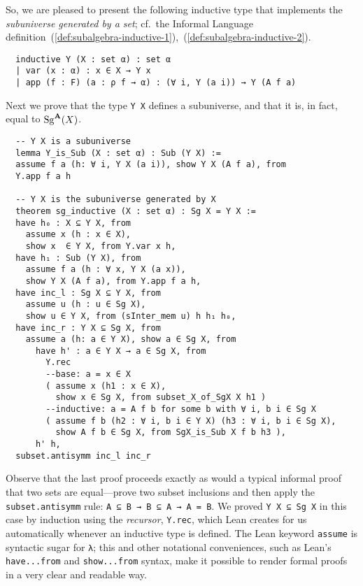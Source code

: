 \documentclass[11pt]{amsart}  %
\begin{document}
So, we are pleased to present the following inductive type that implements 
the \emph{subuniverse generated by a set}; cf.~the Informal Language definition~(\ref{def:subalgebra-inductive-1}),~(\ref{def:subalgebra-inductive-2}).
\begin{lstlisting}        
  inductive Y (X : set α) : set α
  | var (x : α) : x ∈ X → Y x
  | app (f : F) (a : ρ f → α) : (∀ i, Y (a i)) → Y (A f a)
\end{lstlisting}  
Next we prove that the type \lstinline{Y X} defines a subuniverse, and that it is, in fact, equal to $\operatorname{Sg}^{\mathbf{A}}(X)$.
\begin{lstlisting}  
  -- Y X is a subuniverse
  lemma Y_is_Sub (X : set α) : Sub (Y X) := 
  assume f a (h: ∀ i, Y X (a i)), show Y X (A f a), from 
  Y.app f a h 

  -- Y X is the subuniverse generated by X
  theorem sg_inductive (X : set α) : Sg X = Y X :=
  have h₀ : X ⊆ Y X, from 
    assume x (h : x ∈ X), 
    show x  ∈ Y X, from Y.var x h,
  have h₁ : Sub (Y X), from 
    assume f a (h : ∀ x, Y X (a x)), 
    show Y X (A f a), from Y.app f a h,
  have inc_l : Sg X ⊆ Y X, from 
    assume u (h : u ∈ Sg X), 
    show u ∈ Y X, from (sInter_mem u) h h₁ h₀,
  have inc_r : Y X ⊆ Sg X, from
    assume a (h: a ∈ Y X), show a ∈ Sg X, from
      have h' : a ∈ Y X → a ∈ Sg X, from 
        Y.rec
        --base: a = x ∈ X
        ( assume x (h1 : x ∈ X), 
          show x ∈ Sg X, from subset_X_of_SgX X h1 )
        --inductive: a = A f b for some b with ∀ i, b i ∈ Sg X
        ( assume f b (h2 : ∀ i, b i ∈ Y X) (h3 : ∀ i, b i ∈ Sg X),
          show A f b ∈ Sg X, from SgX_is_Sub X f b h3 ),
      h' h,
  subset.antisymm inc_l inc_r
  \end{lstlisting}  
Observe that the last proof proceeds exactly as would a typical informal proof that two sets are equal---prove two subset inclusions and then apply the \lstinline{subset.antisymm} rule: \lstinline{A ⊆ B → B ⊆ A → A = B}. 
We proved \lstinline{Y X ⊆ Sg X} in this case by induction using the \emph{recursor}, \lstinline{Y.rec}, which Lean creates for us automatically whenever an inductive type is defined. The Lean keyword \lstinline{assume} is syntactic sugar for \lstinline{λ}; this and other notational conveniences, such as Lean's \lstinline{have...from} and \lstinline{show...from} syntax, make it possible to render formal proofs in a very clear and readable way.



\end{document}
